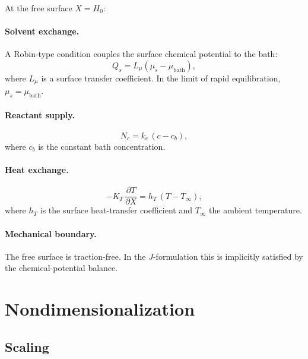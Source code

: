 \documentclass[aps,pre,reprint,superscriptaddress,longbibliography,floatfix]{revtex4-2}
\begin{document}
At the free surface $X=H_0$:

\paragraph{Solvent exchange.}
A Robin-type condition couples the surface chemical potential to the bath:
\begin{equation}
  Q_s = L_\mu\!\left(\mu_s - \mu_\mathrm{bath}\right),
  \label{eq:bc_mu}
\end{equation}
where $L_\mu$ is a surface transfer coefficient. In the limit of rapid equilibration, $\mu_s = \mu_\mathrm{bath}$.

\paragraph{Reactant supply.}
\begin{equation}
  N_c = k_c\,(c - c_b),
  \label{eq:bc_c}
\end{equation}
where $c_b$ is the constant bath concentration.

\paragraph{Heat exchange.}
\begin{equation}
  -K_T\,\frac{\partial T}{\partial X} = h_T\,(T - T_\infty),
  \label{eq:bc_T}
\end{equation}
where $h_T$ is the surface heat-transfer coefficient and $T_\infty$ the ambient temperature.

\paragraph{Mechanical boundary.}
The free surface is traction-free. In the $J$-formulation this is implicitly satisfied by the chemical-potential balance.

\section{Nondimensionalization}
\label{app:nondim}

\subsection{Scaling}
\end{document}
